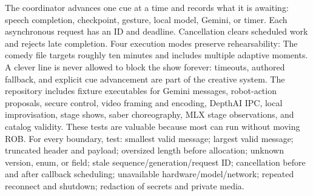 {}The coordinator advances one cue at a time and records what it is awaiting: speech completion, checkpoint, gesture, local model, Gemini, or timer. Each asynchronous request has an ID and deadline. Cancellation clears scheduled work and rejects late completion.\markdownRendererParagraphSeparator
{}Four execution modes preserve rehearsability:\markdownRendererInterblockSeparator
{}\markdownRendererInterblockSeparator
{}The comedy file targets roughly ten minutes and includes multiple adaptive moments. A clever line is never allowed to block the show forever: timeouts, authored fallback, and explicit cue advancement are part of the creative system.\markdownRendererInterblockSeparator
{}
\markdownRendererSectionEnd \markdownRendererSectionBegin
{}\markdownRendererInterblockSeparator
{}The repository includes fixture executables for Gemini messages, robot-action proposals, secure control, video framing and encoding, DepthAI IPC, local improvisation, stage shows, saber choreography, MLX stage observations, and catalog validity. These tests are valuable because most can run without moving ROB.\markdownRendererParagraphSeparator
{}For every boundary, test:\markdownRendererInterblockSeparator
{}\markdownRendererOlBegin
{}smallest valid message;\markdownRendererOlItemEnd 
{}largest valid message;\markdownRendererOlItemEnd 
{}truncated header and payload;\markdownRendererOlItemEnd 
{}oversized length before allocation;\markdownRendererOlItemEnd 
{}unknown version, enum, or field;\markdownRendererOlItemEnd 
{}stale sequence/generation/request ID;\markdownRendererOlItemEnd 
{}cancellation before and after callback scheduling;\markdownRendererOlItemEnd 
{}unavailable hardware/model/network;\markdownRendererOlItemEnd 
{}repeated reconnect and shutdown;\markdownRendererOlItemEnd 
{}redaction of secrets and private media.\markdownRendererOlItemEnd 
\markdownRendererOlEnd \markdownRendererInterblockSeparator
